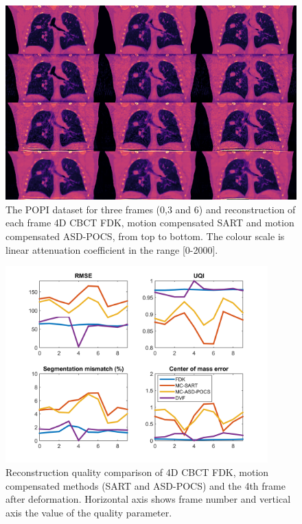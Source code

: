 \begin{figure}
\begin{center}

\includegraphics[width=\textwidth]{accuracyMC/MCCBCT3stage.png} 


\end{center}

\caption[Three frames of the motion compensated CBCT recosntruction with different algorithm]{\label{fig:MCCBCT3static} The POPI dataset for three frames (0,3 and 6) and reconstruction of each frame 4D CBCT FDK, motion compensated SART and motion compensated ASD-POCS, from top to bottom.  The colour scale is linear attenuation coefficient in the range [0-2000].} 
\end{figure}

\begin{figure}
\begin{center}

\includegraphics[width=0.9\textwidth]{accuracyMC/MCCBCTparams.png} 


\end{center}

\caption[Reconstruction quality comparison of motion compensation]{\label{fig:MCCBCTquality} Reconstruction quality comparison of 4D CBCT FDK, motion compensated methods (SART and ASD-POCS) and the 4th frame after deformation. Horizontal axis shows frame number and vertical axis the value of the quality parameter.} 
\end{figure}

